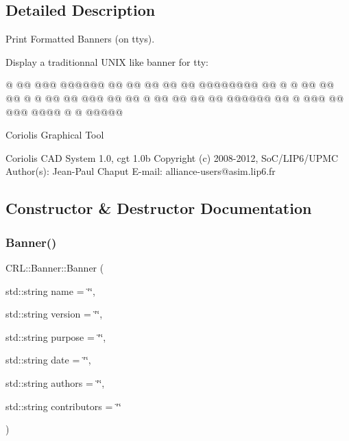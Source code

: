 \subsection{Detailed Description}
Print Formatted Banners (on ttys). 

Display a traditionnal U\+N\+IX like banner for tty\+: \begin{DoxyVerb}                                               @     
                                              @@     
                             @@@     @@@@@@   @@    
                           @@   @@  @@  @@  @@@@@@@@ 
                          @@     @  @   @@    @@     
                          @@        @   @     @@     
                          @@         @@@      @@     
                          @@     @  @@        @@     
                           @@   @@  @@@@@@    @@   @ 
                             @@@   @@   @@@    @@@@  
                                    @     @          
                                     @@@@@           

                            Coriolis Graphical Tool

        Coriolis CAD System 1.0,                               cgt 1.0b
        Copyright (c) 2008-2012,                          SoC/LIP6/UPMC
        Author(s):                                     Jean-Paul Chaput
        E-mail:                             alliance-users@asim.lip6.fr
\end{DoxyVerb}
 

\subsection{Constructor \& Destructor Documentation}
\mbox{\label{classCRL_1_1Banner_ab1648ee84ac8c3a8df32fe224e762322}} 
\subsubsection{\texorpdfstring{Banner()}{Banner()}}
{\footnotesize\ttfamily C\+R\+L\+::\+Banner\+::\+Banner (\begin{DoxyParamCaption}\item[{std\+::string}]{name = {\ttfamily \char`\"{}\char`\"{}},  }\item[{std\+::string}]{version = {\ttfamily \char`\"{}\char`\"{}},  }\item[{std\+::string}]{purpose = {\ttfamily \char`\"{}\char`\"{}},  }\item[{std\+::string}]{date = {\ttfamily \char`\"{}\char`\"{}},  }\item[{std\+::string}]{authors = {\ttfamily \char`\"{}\char`\"{}},  }\item[{std\+::string}]{contributors = {\ttfamily \char`\"{}\char`\"{}} }\end{DoxyParamCaption})}


